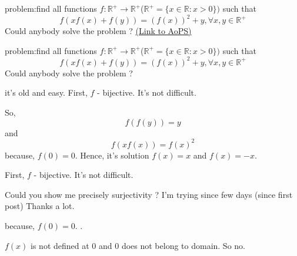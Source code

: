 \begin{problem}
	problem:find all functions $f:\mathbb{R^+}\to\mathbb{R^+}$($\mathbb{R^+}=\{x\in\mathbb{R}:x>0\})$ such that
\[f(xf(x)+f(y))=(f(x))^2+y,\forall x,y\in\mathbb{R^+}\]
Could anybody solve the problem ?
	\flushright \href{https://artofproblemsolving.com/community/c6h532651}{(Link to AoPS)}
\end{problem}



\begin{solution}
	\begin{tcolorbox}problem:find all functions $f:\mathbb{R^+}\to\mathbb{R^+}$($\mathbb{R^+}=\{x\in\mathbb{R}:x>0\})$ such that
\[f(xf(x)+f(y))=(f(x))^2+y,\forall x,y\in\mathbb{R^+}\]
Could anybody solve the problem ?\end{tcolorbox}
it's old and easy.
  First,  $f$ - bijective.
It's not difficult.

So, \[ f(f(y))=y \] and \[ f(xf(x))=f(x)^2 \]
because,  $f(0)=0$.
Hence, it's solution $f(x)=x
$ and $f(x)=-x$.
\end{solution}



\begin{solution}
	\begin{tcolorbox}
  First,  $f$ - bijective.
It's not difficult.\end{tcolorbox}
Could you show me precisely surjectivity ?
I'm trying since few days (since first post)
Thanks a lot.

\begin{tcolorbox}
because,  $f(0)=0$.
.\end{tcolorbox}
$f(x)$ is not defined at $0$ and $0$ does not belong to domain.
So no.
\end{solution}







